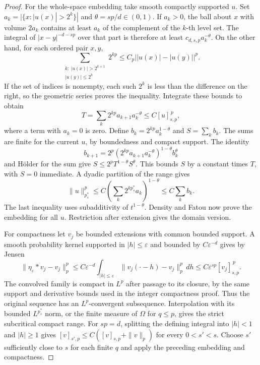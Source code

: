 \documentclass[11pt,oneside,openany]{book}
\theoremstyle{definition}
\theoremstyle{remark}
\begin{document}
\begin{proof}
For the whole-space embedding take smooth compactly supported \(u\).
Set \(a_k=|\{x:|u(x)|>2^k\}|\) and \(\theta=sp/d\in(0,1)\).
If \(a_k>0\), the ball about \(x\) with volume \(2a_k\) contains
at least \(a_k\) of the complement of the \(k\)-th level set.
The integral of \(|x-y|^{-d-sp}\) over that part is therefore at
least \(c_{d,s,p}a_k^{-\theta}\). On the other hand, for each
ordered pair \(x,y\),
\[
 \sum_{\substack{k:\ |u(x)|>2^{k+1}\\ |u(y)|\le2^k}}2^{kp}
 \le C_p\bigl||u(x)|-|u(y)|\bigr|^p .
\]
If the set of indices is nonempty, each such \(2^k\) is less
than the difference on the right, so the geometric series
proves the inequality. Integrate these bounds to obtain
\[
 T=\sum_k 2^{kp}a_{k+1}a_k^{-\theta}
 \le C [u]_{s,p}^{\,p},
\]
where a term with \(a_k=0\) is zero. Define
\(b_k=2^{kp}a_k^{1-\theta}\) and \(S=\sum_k b_k\). The sums are
finite for the current \(u\), by boundedness and compact support.
The identity
\[
 b_{k+1}
 =2^p(2^{kp}a_{k+1}a_k^{-\theta})^{1-\theta}b_k^\theta
\]
and H\"older for the sum give \(S\le2^pT^{1-\theta}S^\theta\).
This bounds \(S\) by a constant times \(T\), with \(S=0\)
immediate. A dyadic partition of the range gives
\[
 \|u\|_{p_s^*}^p
 \le C\left(\sum_k 2^{kp_s^*}a_k\right)^{1-\theta}
 \le C\sum_k b_k .
\]
The last inequality uses subadditivity of \(t^{1-\theta}\).
Density and Fatou now prove the embedding for all \(u\).
Restriction after extension gives the domain version.

For compactness let \(v_j\) be bounded extensions with common
bounded support. A smooth probability kernel supported in
\(|h|\le\varepsilon\) and bounded by \(C\varepsilon^{-d}\)
gives by Jensen
\[
 \|\eta_\varepsilon*v_j-v_j\|_p^p
 \le C\varepsilon^{-d}\int_{|h|\le\varepsilon}
     \|v_j(\cdot-h)-v_j\|_p^p\,dh
 \le C\varepsilon^{sp}[v_j]_{s,p}^{\,p}.
\]
The convolved family is compact in \(L^p\) after passage to its
closure, by the same support and derivative bounds used in
the integer compactness proof. Thus the original sequence has an
\(L^p\)-convergent subsequence. Interpolation with its bounded
\(L^{p_s^*}\) norm, or the finite measure of \(\Omega\) for \(q\le p\),
gives the strict subcritical compact range. For \(sp=d\),
splitting the defining integral into \(|h|<1\) and \(|h|\ge1\)
gives \([v]_{s',p}\le C([v]_{s,p}+\|v\|_p)\) for every \(0<s'<s\).
Choose \(s'\) sufficiently close to \(s\) for each finite \(q\)
and apply the preceding embedding and compactness.


\end{proof}
\end{document}
